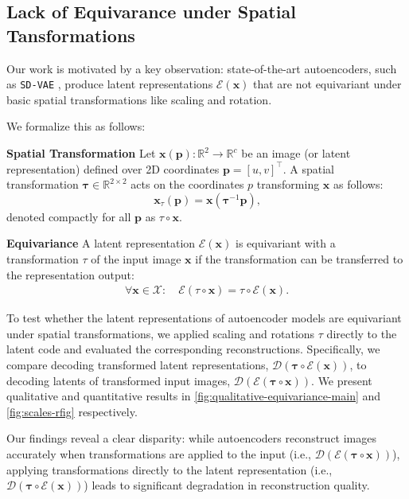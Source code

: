 \subsection{Lack of Equivarance under Spatial Tansformations}
\label{sec:irregularity}



Our work is motivated by a key observation: state-of-the-art autoencoders, such as \texttt{SD-VAE} \cite{rombach2022high}, produce latent representations 
$\mathcal{E}(\mathbf{x})$ that are not equivariant under basic spatial transformations like scaling and rotation. 

We formalize this as follows:

\noindent \textbf{Spatial Transformation} Let $\mathbf{x}(\mathbf{p}): \mathbb{R}^2 \rightarrow \mathbb{R}^c$ be an image (or latent representation) defined over 2D coordinates  \mbox{$\mathbf{p} = [u, v]^\top$}. 
A spatial transformation $\mathbf{\tau} \in \mathbb{R}^{2 \times 2}$ acts on the coordinates $p$ transforming $\mathbf{x}$ as follows:
\begin{equation} \label{eq:transformation}
\mathbf{x}_{\tau}(\mathbf{p}) =\mathbf{x}(\mathbf{\tau}^{-1} \mathbf{p})\text{,}
\end{equation}
denoted compactly for all $\mathbf{p}$ as $\tau \circ \mathbf{x}$.


\noindent \textbf{Equivariance} A latent representation $\mathcal{E}(\mathbf{x})$ is equivariant with a
transformation $\tau$ of the input image $\mathbf{x}$ if the transformation
can be transferred to the representation output: 
\begin{align}
    \label{eq:equivariace}
    \forall \mathbf{x} \in \mathcal{X}: \quad \mathcal{E}(\tau \circ \mathbf{x}) = \tau \circ \mathcal{E}(\mathbf{x})\text{.}
\end{align}

To test whether the latent representations of autoencoder models are equivariant under spatial transformations, we applied scaling and rotations $\tau$ directly to the latent code and evaluated the corresponding reconstructions. 
Specifically, we compare decoding transformed latent representations, $\mathcal{D}(\mathbf{\tau} \circ \mathcal{E}(\mathbf{x}))$, to decoding latents of transformed input images, $\mathcal{D}(\mathcal{E}(\mathbf{\tau} \circ \mathbf{x}))$. 
We present qualitative and quantitative results in \autoref{fig:qualitative-equivariance-main} and \autoref{fig:scales-rfig} respectively.

Our findings reveal a clear disparity: while autoencoders reconstruct images accurately when transformations are applied to the input (i.e., $\mathcal{D}(\mathcal{E}(\mathbf{\tau} \circ \mathbf{x}))$), applying transformations directly to the latent representation (i.e., $\mathcal{D}(\mathbf{\tau} \circ \mathcal{E}(\mathbf{x}))$) leads to significant degradation in reconstruction quality.

